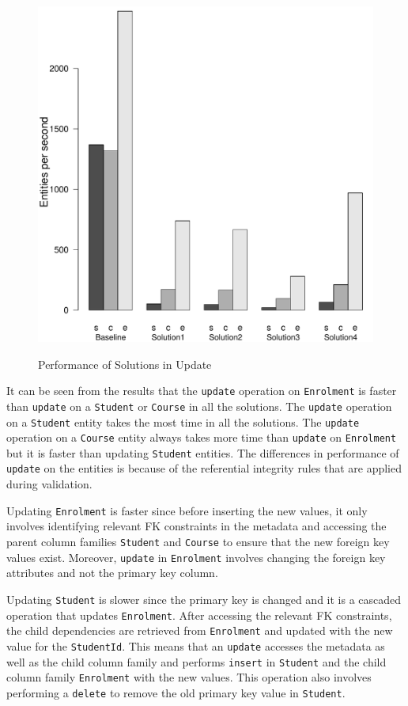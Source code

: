 \begin{figure}[H]
		{\includegraphics[width=\Width]{figure/result/barplot-update-tp.pdf}\label{fres:Update-throughput}}
		\caption{Performance of Solutions in Update}\label{fres:Update}
	\end{figure}
 
It can be seen from the results that the \texttt{update} operation on
\texttt{Enrolment} is  faster than \texttt{update} on a \texttt{Student} or
\texttt{Course} in all the solutions. 
The \texttt{update} operation  on a \texttt{Student} entity takes the most time
in all the solutions. 
The \texttt{update} operation on a \texttt{Course} entity always takes more time
than \texttt{update} on \texttt{Enrolment} but it is faster than updating
\texttt{Student} entities. The differences in  performance of 
\texttt{update} on the  entities is because of the referential integrity
rules that are applied during validation. 


Updating \texttt{Enrolment} is faster since before inserting the new values,  it
only  involves  identifying relevant \ac{FK} constraints in the metadata and 
accessing the parent column families \texttt{Student} and \texttt{Course} to
ensure that the new foreign key values exist.  Moreover,  \texttt{update} in
\texttt{Enrolment} involves changing the foreign key attributes and not the
primary key column. 

Updating \texttt{Student} is slower since the primary key is changed and it is a
cascaded operation that updates \texttt{Enrolment}.  After accessing the
relevant \ac{FK} constraints,  the child dependencies are retrieved from
\texttt{Enrolment} and updated with the new value for the \texttt{StudentId}.
This means that an \texttt{update} accesses the metadata as well as the child
column family and performs \texttt{insert} in \texttt{Student} and the child
column family \texttt{Enrolment} with the new values.  This operation also
involves performing a \texttt{delete} to remove the old primary key value in
\texttt{Student}.


